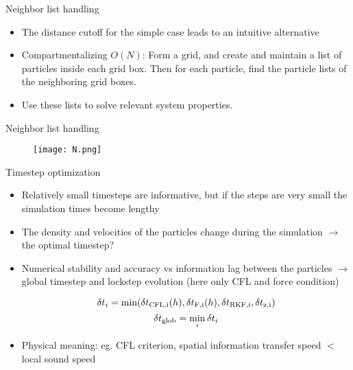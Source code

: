 \documentclass{beamer}
\begin{document}
\begin{frame}{Neighbor list handling}
\begin{itemize}

\item The distance cutoff for the simple case leads to an intuitive alternative
\item Compartmentalizing  $O(N)$: Form a grid, and create and maintain a list of particles inside each grid box. Then for each particle, find the particle lists of the neighboring grid boxes.
\item Use these lists to solve relevant system properties.
\end{itemize}
\end{frame}

\begin{frame}{Neighbor list handling}

\begin{figure}[!ht]
\begin{center}
\texttt{[image: N.png]} 

\end{center}
\end{figure}

\end{frame}




\begin{frame}{Timestep optimization}
\begin{itemize}

\item Relatively small timesteps are informative, but if the steps are very small the simulation times become lengthy
\item The density and velocities of the particles change during the simulation $\rightarrow$ the optimal timestep?
\item Numerical stability and accuracy vs information lag between the particles $\rightarrow$ global timestep and lockstep evolution (here only CFL and force condition)

\begin{equation}
\delta t_{i} = \min(\delta t_{\rm CFL,i}(h),\delta t_{\rm F,i}(h),\delta t_{\rm RKF,i},\delta t_{\rm 
z,i})
\end{equation}
\begin{equation}
\delta t_{\rm glob} = \min_i{\delta t_i}
\end{equation}

\item Physical meaning: eg. CFL criterion, spatial information transfer speed $<$ local sound speed

\end{itemize}
\end{frame}
\end{document}
